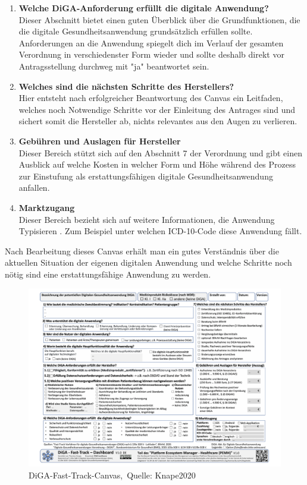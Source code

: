 \begin{enumerate}
	\item \textbf{Welche DiGA-Anforderung erfüllt die digitale Anwendung?}
	\\Dieser Abschnitt bietet einen guten Überblick über die Grundfunktionen, die die digitale Gesundheitsanwendung grundsätzlich erfüllen sollte. Anforderungen an die Anwendung spiegelt dich im Verlauf der gesamten Verordnung in verschiedenster Form wieder und sollte deshalb direkt vor Antragsstellung durchweg mit "ja" beantwortet sein. 
	\item \textbf{Welches sind die nächsten Schritte des Herstellers?}
	\\ Hier entsteht nach erfolgreicher Beantwortung des Canvas ein Leitfaden, welches noch Notwendige Schritte vor der Einleitung des Antrages sind und sichert somit die Hersteller ab, nichts relevantes aus den Augen zu verlieren.
	\item \textbf{Gebühren und Auslagen für Hersteller}
	\\Dieser Bereich stützt sich auf den Abschnitt 7 der Verordnung und gibt einen Ausblick auf welche Kosten in welcher Form und Höhe während des Prozess zur Einstufung als erstattungsfähigen digitale Gesundheitsanwendung anfallen.
	\item \textbf{Marktzugang}
	\\Dieser Bereich bezieht sich auf weitere Informationen, die Anwendung Typisieren . Zum Beispiel unter welchen ICD-10-Code diese Anwendung fällt.
	
\end{enumerate}

Nach Bearbeitung dieses Canvas erhält man ein gutes Verständnis über die aktuellen Situation der eigenen digitalen Anwendung und welche Schritte noch nötig sind eine erstattungsfähige Anwendung zu werden. 
\begin{figure}[H]
	\centering
	\includegraphics[width=450px, keepaspectratio]{assets/DiGA_Canvas.pdf}
	\caption[DiGA-Fast-Track-Canvas]{DiGA-Fast-Track-Canvas,~Quelle: Knape2020}
\end{figure}


